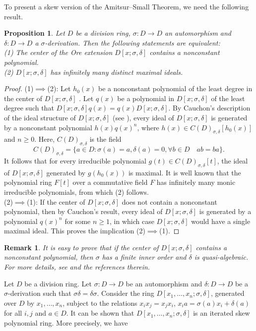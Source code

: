 \documentclass[11pt,a4paper]{article}
\theoremstyle{theorem}
\newtheorem{proposition}[theorem]{Proposition}
\newtheorem{remark}{Remark}[section]
\numberwithin{equation}{section}
\newcommand{\s}{\sigma}
\begin{document}
	To present a skew version of the Amitsur--Small Theorem, we need the following result. 
	\begin{proposition}\label{prop: center-maximal-ideals}
		Let $D$ be a division ring, $\s:D\to D$ an automorphism and $\delta:D\to D$  a $\s$-derivation. Then  the following statements are equivalent:\\
		(1) The center of the Ore extension $D[x;\s,\delta]$ contains a nonconstant polynomial.\\
		(2) $D[x;\s,\delta]$ has infinitely many distinct maximal ideals. 
	\end{proposition}
	\begin{proof}
		(1)\(\implies\)(2): Let \(h_0(x)\) be a nonconstant polynomial of the least degree in the center of \(D[x;\s,\delta]\) . Let \(q(x)\) be a polynomial in $D[x;\s,\delta]$ of the least degree such that \(D[x;\s,\delta]q(x) = q(x) D[x;\s,\delta]\). By Cauchon's description of the ideal structure of \(D[x;\sigma,\delta]\) (see \cite{Cauchon}), every ideal of $D[x;\s,\delta]$ is generated by a nonconstant polynomial \(h(x)q(x)^n\), where  \(h(x)\in C(D)_{\sigma,\delta}[h_0(x)]\) and \(n\geq 0\). Here,   \(C(D)_{\sigma,\delta}\) is the field
		\[
			C(D)_{\sigma,\delta} = \{a\in D: \sigma(a) = a, \delta(a) =0, \forall b\in D\quad ab = ba\}.
		\]
		It follows that for every irreducible polynomial  \(g(t)\in C(D)_{\sigma,\delta}[t]\), the ideal of \(D[x;\sigma,\delta]\) generated by \(g(h_0(x))\) is maximal. It is well known that the polynomial ring \(F[t]\) over a commutative field \(F\) has infinitely many monic irreducible polynomials, from which (2) follows. \\
		(2)\(\implies\)(1): If the center of \(D[x;\sigma,\delta]\) does not contain a nonconstant polynomial, then by Cauchon's result, every ideal of $D[x;\s,\delta]$ is generated by a polynomial \(q(x)^n\) for some \(n\geq 1\), in which case	\(D[x;\sigma,\delta]\) would have a single maximal ideal. This proves the implication (2)\(\implies\)(1).  
	\end{proof}
	\begin{remark}
		It is easy to prove that if the center of \(D[x;\sigma,\delta]\) contains a nonconstant polynomial, then \(\sigma\) has a finite inner order and \(\delta\) is quasi-algebraic. For more details, see \cite{lam1invariant} and the references therein.   
	\end{remark}
	Let $D$ be a division ring. Let $\s:D\to D$ be an automorphism  and $\delta:D\to D$ be   a $\s$-derivation such that \(\sigma\delta = \delta\sigma\). Consider the ring \(D[x_1,\dots,x_n;\sigma,\delta]\), generated over \(D\) by \(x_1,\dots,x_n\), subject to the relations \(x_ix_j=x_jx_i\), \(x_ia=\s(a)x_i+\delta(a)\) for all \(i,j\) and \(a\in D\). It can be shown that  \(D[x_1,\dots,x_n;\sigma,\delta]\) is an iterated skew polynomial ring. More precisely, we have 
\end{document}

